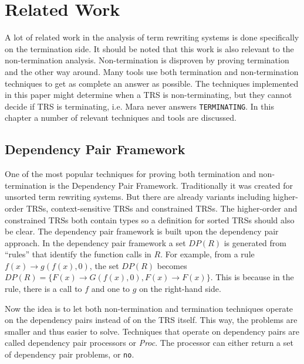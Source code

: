 \newcommand\TTTT{%
 \textsf{T\kern-0.15em\raisebox{-0.55ex}T\kern-0.15emT\kern-0.15em\raisebox{-0.55ex}2\kern.15em}%
}
\newcommand\TTT{%
 \textsf{T\kern-0.15em\raisebox{-0.55ex}T\kern-0.15emT}%
}

\chapter{Related Work}\label{relatedwork}
A lot of related work in the analysis of term rewriting systems is done specifically on the termination side. It should be noted that this work is also relevant to the non-termination analysis. Non-termination is disproven by proving termination and the other way around. Many tools use both termination and non-termination techniques to get as complete an answer as possible. The techniques implemented in this paper might determine when a TRS is non-terminating, but they cannot decide if TRS is terminating, i.e. Mara never answers \texttt{TERMINATING}. In this chapter a number of relevant techniques and tools are discussed.

\section{Dependency Pair Framework}
One of the most popular techniques for proving both termination and non-termination is the Dependency Pair Framework\cite{thiemann2007dp}. Traditionally it was created for unsorted term rewriting systems. But there are already variants including higher-order TRSs, context-sensitive TRSs and constrained TRSs. The higher-order and constrained TRSs both contain types so a definition for sorted TRSs should also be clear. The dependency pair framework is built upon the dependency pair approach\cite{arts2000termination}. In the dependency pair framework a set $DP(R)$ is generated from ``rules'' that identify the function calls in $R$. For example, from a rule $f(x) \rightarrow g(f(x), 0)$, the set $DP(R)$ becomes $DP(R) = \{ F(x) \rightarrow G(f(x), 0), F(x) \rightarrow F(x) \}$. This is because in the rule, there is a call to $f$ and one to $g$ on the right-hand side.

Now the idea is to let both non-termination and termination techniques operate on the dependency pairs instead of on the TRS itself. This way, the problems are smaller and thus easier to solve. Techniques that operate on dependency pairs are called dependency pair processors or \textit{Proc}. The processor can either return a set of dependency pair problems, or \texttt{no}. 

